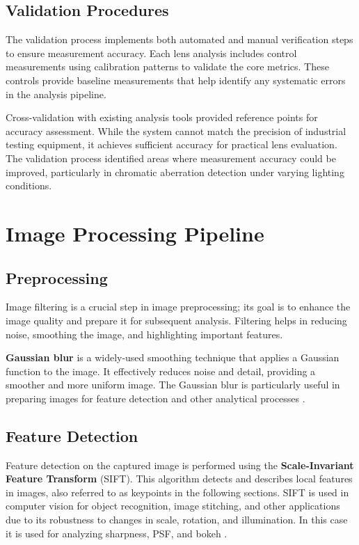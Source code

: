 \subsection{Validation Procedures} 
The validation process implements both automated and manual verification steps to ensure measurement accuracy. Each lens analysis includes control measurements using calibration patterns to validate the core metrics. These controls provide baseline measurements that help identify any systematic errors in the analysis pipeline.

Cross-validation with existing analysis tools provided reference points for accuracy assessment. While the system cannot match the precision of industrial testing equipment, it achieves sufficient accuracy for practical lens evaluation. The validation process identified areas where measurement accuracy could be improved, particularly in chromatic aberration detection under varying lighting conditions.
\section{Image Processing Pipeline}

\subsection{Preprocessing}
Image filtering is a crucial step in image preprocessing; its goal is to enhance the image quality and prepare it for subsequent analysis. Filtering helps in reducing noise, smoothing the image, and highlighting important features.

\textbf{Gaussian blur} is a widely-used smoothing technique that applies a Gaussian function to the image. It effectively reduces noise and detail, providing a smoother and more uniform image. The Gaussian blur is particularly useful in preparing images for feature detection and other analytical processes \cite{gaussian}.

\subsection{Feature Detection}
Feature detection on the captured image is performed using the \textbf{Scale-Invariant Feature Transform} (SIFT). This algorithm detects and describes local features in images, also referred to as keypoints in the following sections. SIFT is used in computer vision for object recognition, image stitching, and other applications due to its robustness to changes in scale, rotation, and illumination. In this case it is used for analyzing sharpness, PSF, and bokeh \cite{Sift}.

